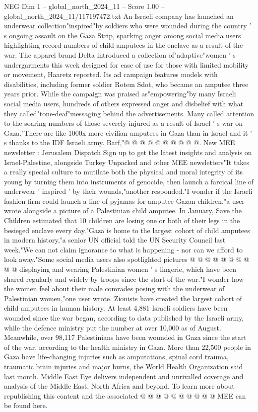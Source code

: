 \begin{textsample}{NEG Dim 1 – global\_north\_2024\_11 – Score 1.00 – global\_north\_2024\_11/117197472.txt}  \label{ex:f1_neg_221}
An Israeli company has launched an underwear collection"inspired"by soldiers who were wounded during the country ' s ongoing assault on the Gaza Strip, sparking anger among social media users highlighting record numbers of child amputees in the enclave as a result of the war.
The apparel brand Delta introduced a collection of"adaptive"women ' s undergarments this week designed for ease of use for those with limited mobility or movement, Haaretz reported.
Its ad campaign features models with disabilities, including former soldier Rotem Sdot, who became an amputee three years prior.
While the campaign was praised as"empowering"by many Israeli social media users, hundreds of others expressed anger and disbelief with what they called"tone-deaf"messaging behind the advertisements.
Many called attention to the soaring numbers of those severely injured as a result of Israel ' s war on Gaza."There are like 1000x more civilian amputees in Gaza than in Israel and it ' s thanks to the IDF Israeli army.
Barf,"@ @ @ @ @ @ @ @ @ @.
New MEE newsletter : Jerusalem Dispatch Sign up to get the latest insights and analysis on Israel-Palestine, alongside Turkey Unpacked and other MEE newsletters"It takes a really special culture to mutilate both the physical and moral integrity of its young by turning them into instruments of genocide, then launch a farcical line of underwear ' inspired ' by their wounds,"another responded."I wonder if the Israeli fashion firm could launch a line of pyjamas for amputee Gazan children,"a user wrote alongside a picture of a Palestinian child amputee.
In January, Save the Children estimated that 10 children are losing one or both of their legs in the besieged enclave every day."Gaza is home to the largest cohort of child amputees in modern history,"a senior UN official told the UN Security Council last week."We can not claim ignorance to what is happening - nor can we afford to look away."Some social media users also spotlighted pictures @ @ @ @ @ @ @ @ @ @ displaying and wearing Palestinian women ' s lingerie, which have been shared regularly and widely by troops since the start of the war."I wonder how the women feel about their male comrades posing with the underwear of Palestinian women,"one user wrote.
Zionists have created the largest cohort of child amputees in human history.
At least 4,881 Israeli soldiers have been wounded since the war began, according to data published by the Israeli army, while the defence ministry put the number at over 10,000 as of August.
Meanwhile, over 98,117 Palestinians have been wounded in Gaza since the start of the war, according to the health ministry in Gaza.
More than 22,500 people in Gaza have life-changing injuries such as amputations, spinal cord trauma, traumatic brain injuries and major burns, the World Health Organization said last month.
Middle East Eye delivers independent and unrivalled coverage and analysis of the Middle East, North Africa and beyond.
To learn more about republishing this content and the associated @ @ @ @ @ @ @ @ @ @ MEE can be found here.

\end{textsample}
